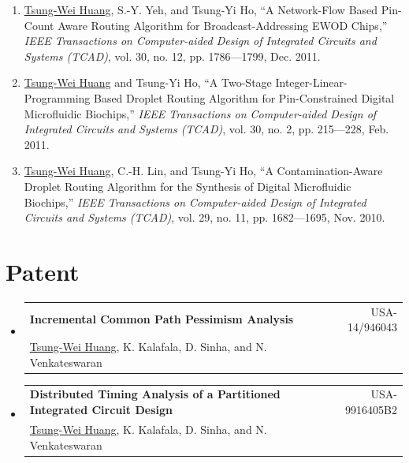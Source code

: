 \documentclass[A4,11pt]{article}
\makeatletter
\newcommand{\CVSubheading}[4]{
  \vspace{-2pt}\item
    \begin{tabular*}{0.97\textwidth}[t]{l@{\extracolsep{\fill}}r}
      \textbf{#1} & #2 \\
      \small#3 & \small #4 \\
    \end{tabular*}\vspace{-7pt}
}
\newcommand{\CVSubHeadingListStart}{\begin{itemize}[leftmargin=0.5cm, label={}]}
\newcommand{\CVSubHeadingListEnd}{\end{itemize}}
\makeatother
\begin{document}
\begin{enumerate}
  \item \underline{Tsung-Wei Huang}, S.-Y. Yeh, and Tsung-Yi Ho, ``A Network-Flow Based Pin-Count Aware Routing Algorithm for Broadcast-Addressing EWOD Chips,'' \textit{IEEE Transactions on Computer-aided Design of Integrated Circuits and Systems (TCAD)}, vol. 30, no. 12, pp. 1786—1799, Dec. 2011.
  \item \underline{Tsung-Wei Huang} and Tsung-Yi Ho, ``A Two-Stage Integer-Linear-Programming Based Droplet Routing Algorithm for Pin-Constrained Digital Microfluidic Biochips,'' \textit{IEEE Transactions on Computer-aided Design of Integrated Circuits and Systems (TCAD)}, vol. 30, no. 2, pp. 215—228, Feb. 2011. 
  \item \underline{Tsung-Wei Huang}, C.-H. Lin, and Tsung-Yi Ho, ``A Contamination-Aware Droplet Routing Algorithm for the Synthesis of Digital Microfluidic Biochips,'' \textit{IEEE Transactions on Computer-aided Design of Integrated Circuits and Systems (TCAD)}, vol. 29, no. 11, pp. 1682—1695, Nov. 2010. 

 \end{enumerate}

\section{Patent}
  \CVSubHeadingListStart
    \CVSubheading %
     {Incremental Common Path Pessimism Analysis}{USA-14/946043}
     {\underline{Tsung-Wei Huang}, K. Kalafala, D. Sinha, and N. Venkateswaran}{}
    \CVSubheading %
     {Distributed Timing Analysis of a Partitioned Integrated Circuit Design}{USA-9916405B2}
     {\underline{Tsung-Wei Huang}, K. Kalafala, D. Sinha, and N. Venkateswaran}{}
  \CVSubHeadingListEnd  

\end{document}
